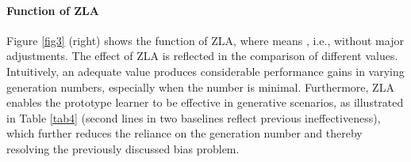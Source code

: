 \documentclass{article}
\begin{document}
    	\begin{table}[t]
		\centering
        	\vspace{-0.5ex}
		\caption{\textbf{Vanilla softmax classifier} vs. \textbf{prototype learner}, based on WGAN, where L.N. represents a large generation number.}
        	\vspace{-2ex}  
		\label{tab4}
	\end{table}

\paragraph{Function of ZLA}
Figure \ref{fig3} (right) shows the function of ZLA, where  means , i.e., without major adjustments. The effect of ZLA is reflected in the comparison of different  values. Intuitively, an adequate  value produces considerable performance gains in varying generation numbers, especially when the number is minimal. Furthermore, ZLA enables the prototype learner to be effective in generative scenarios, as illustrated in Table \ref{tab4} (second lines in two baselines reflect previous ineffectiveness), which further reduces the reliance on the generation number and thereby resolving the previously discussed bias problem.
    
\end{document}

